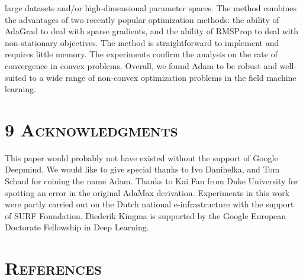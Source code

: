 \documentclass[11pt]{article}
\begin{document}
\noindent
large datasets and/or high-dimensional parameter spaces. The
method combines the advantages of two recently popular
optimization methods: the ability of AdaGrad to deal with sparse
gradients, and the ability of RMSProp to deal with non-stationary
objectives. The method is straightforward to implement and
requires little memory. The experiments confirm the analysis on
the rate of convergence in convex problems. Overall, we found
Adam to be robust and well-suited to a wide range of non-convex
optimization problems in the field machine learning.

\vspace{0.5em}

\section*{9 \textsc{Acknowledgments}}

This paper would probably not have existed without the support
of Google Deepmind. We would like to give special thanks to Ivo
Danihelka, and Tom Schaul for coining the name Adam. Thanks to
Kai Fan from Duke University for spotting an error in the
original AdaMax derivation. Experiments in this work were partly
carried out on the Dutch national e-infrastructure with the
support of SURF Foundation. Diederik Kingma is supported by the
Google European Doctorate Fellowship in Deep Learning.

\vspace{0.5em}

\section*{\textsc{References}}
\end{document}
